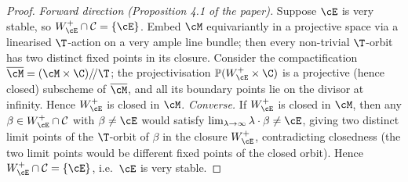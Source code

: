 \begin{proof}
  \textit{Forward direction (Proposition 4.1 of the paper).}
  Suppose \(\cE\) is very stable, so \(W^+_{\cE} \cap \mathcal{C} = \{\cE\}\).  Embed \(\cM\)
  equivariantly in a projective space via a linearised \(\T\)-action on a very ample line
  bundle; then every non-trivial \(\T\)-orbit has two distinct fixed points in its closure.
  Consider the compactification \(\overline{\cM} = (\cM \times \C) /\!/ \T\); the projectivisation
  \(\mathbb{P}(W^+_{\cE} \times \C)\) is a projective (hence closed) subscheme of
  \(\overline{\cM}\), and all its boundary points lie on the divisor at infinity.  Hence
  \(W^+_{\cE}\) is closed in \(\cM\).
  \textit{Converse.}  If \(W^+_{\cE}\) is closed in \(\cM\), then any
  \(\beta \in W^+_{\cE} \cap \mathcal{C}\) with \(\beta \neq \cE\) would satisfy
  \(\lim_{\lambda \to \infty} \lambda \cdot \beta \neq \cE\), giving two distinct limit points
  of the \(\T\)-orbit of \(\beta\) in the closure \(W^+_{\cE}\), contradicting closedness
  (the two limit points would be different fixed points of the closed orbit).
  Hence \(W^+_{\cE} \cap \mathcal{C} = \{\cE\}\), i.e.\ \(\cE\) is very stable.
\end{proof}

